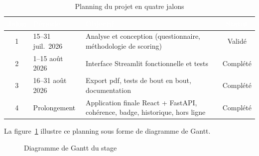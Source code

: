 \begin{table}[H]
  \centering
  \caption{Planning du projet en quatre jalons}
  \label{tab:planning}
  \renewcommand{\arraystretch}{1.4}
  \begin{tabularx}{\textwidth}{|c|l|X|c|}
    \hline
    \rowcolor{iacsTableHead}
    \textcolor{white}{\textbf{Jalon}} &
    \textcolor{white}{\textbf{Période}} &
    \textcolor{white}{\textbf{Objectif}} &
    \textcolor{white}{\textbf{Statut}} \\
    \hline
    1 & 15--31 juil.\ 2026 & Analyse et conception (questionnaire, méthodologie de scoring) & Validé \\
    \hline
    \rowcolor{iacsLightGray}
    2 & 1--15 août 2026 & Interface Streamlit fonctionnelle et tests & Complété \\
    \hline
    3 & 16--31 août 2026 & Export \gls{pdf}, tests de bout en bout, documentation & Complété \\
    \hline
    \rowcolor{iacsLightGray}
    4 & Prolongement & Application finale React + FastAPI, cohérence, badge, historique, hors ligne & Complété \\
    \hline
  \end{tabularx}
\end{table}

La figure~\ref{fig:gantt} illustre ce planning sous forme de diagramme de Gantt.

\begin{figure}[H]
  \centering
  \caption{Diagramme de Gantt du stage}
  \label{fig:gantt}
\end{figure}

